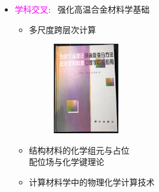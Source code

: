 {\begin{itemize}
\begin{itemize}
\begin{figure}[h!]
\label{TEXT_PPT}
\end{figure}
	\end{itemize}
		\item \textcolor{magenta}{学科交叉}:~ 强化高温合金材料学基础
			\begin{itemize}
				\setlength{\itemsep}{3pt} 
		\item 多尺度跨层次计算
\begin{figure}[h!]
\vspace*{-0.02in}
\centering
\includegraphics[height=1.55in,width=1.15in]{Figures/DFT_Wang.jpg}
\label{DFT_Wang}
\end{figure}
		 \item 结构材料的化学组元与占位\\
			配位场与化学键理论
		 \item 计算材料学中的物理化学计算技术
	\end{itemize}
\end{itemize}
}

